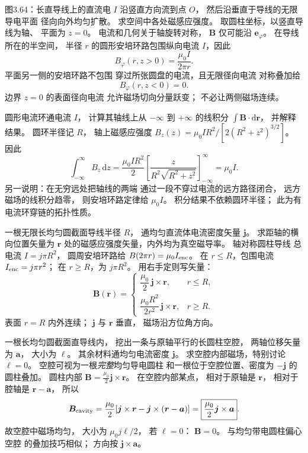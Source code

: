图3.64：长直导线上的直流电
$I$ 沿竖直方向流到点 $O$，
然后沿垂直于导线的无限导电平面
径向向外均匀扩散。
求空间中各处磁感应强度。
\exsolution
取圆柱坐标，以竖直导线为轴、
平面为 $z=0$。
电流和几何关于轴旋转对称，
$\bm B$ 仅可能沿 $\bm e_\varphi$。
在导线所在的半空间，
半径 $r$ 的圆形安培环路包围纵向电流
$I$，因此
\[
\boxed{B_\varphi(r,z>0)=
\frac{\mu_0I}{2\pi r}}.
\]
平面另一侧的安培环路不包围
穿过所张圆盘的电流，且无限径向电流
对称叠加给
\[
\boxed{B_\varphi(r,z<0)=0}.
\]
\excheck 边界 $z=0$ 的表面径向电流
允许磁场切向分量跃变；
不必让两侧磁场连续。

圆形电流环通电流 $I$，
计算其轴线上从 $-\infty$ 到
$+\infty$ 的线积分
$\int\bm B\cdot\mathrm d\bm r$，
并解释结果。
\exsolution
圆环半径记 $R$，
轴上磁感应强度
$B_z(z)=\mu_0IR^2/[2(R^2+z^2)^{3/2}]$。
因此
\[
\int_{-\infty}^{\infty}B_z\,\mathrm dz
=\frac{\mu_0IR^2}{2}
\left[\frac{z}{R^2\sqrt{R^2+z^2}}\right]_{-\infty}^{\infty}
=\boxed{\mu_0I}.
\]
另一说明：在无穷远处把轴线的两端
通过一段不穿过电流的远方路径闭合，
远方磁场的线积分趋零，
则安培环路定律给 $\mu_0I$。
\excheck 积分结果不依赖圆环半径；
此为有电流环穿链的拓扑性质。

一根无限长均匀圆截面导线半径 $R$，
通均匀直流体电流密度矢量 $\bm j$。
求距轴的横向位置矢量为 $\bm r$
处的磁感应强度矢量，内外均为真空磁导率。
\exsolution
轴对称圆柱导线
总电流 $I=j\pi R^2$，
圆周安培环路给
$B(2\pi r)=\mu_0I_{\rm enc}$。
在 $r\le R$，包围电流
$I_{\rm enc}=j\pi r^2$；
在 $r\ge R$，为
$j\pi R^2$。
用右手定则写矢量：
\[
\boxed{\bm B(\bm r)=
\begin{cases}
\dfrac{\mu_0}{2}\,\bm j\times\bm r,
&r\le R,\\[2mm]
\dfrac{\mu_0R^2}{2r^2}\,
\bm j\times\bm r,&r\ge R.
\end{cases}}
\]
\excheck 表面 $r=R$ 内外连续；
$\bm j$ 与 $\bm r$ 垂直，
磁场沿方位角方向。

一根长均匀圆截面直导线内，
挖出一条与原轴平行的长圆柱空腔，
两轴位移矢量为 $\bm a$，
大小为 $\ell$。
其余材料通均匀电流密度 $\bm j$。
求空腔内部磁场，特别讨论 $\ell=0$。
\exsolution
空腔可视为一根\emph{完整}均匀导电圆柱
和一根位于空腔位置、密度为 $-\bm j$
的圆柱叠加。
圆柱内部
$\bm B=\frac{\mu_0}{2}\bm j\times\bm r$。
在空腔内部某点，
相对于原轴是 $\bm r$，
相对于腔轴是 $\bm r-\bm a$，
所以
\[
\bm B_{\rm cavity}=
\frac{\mu_0}{2}
[\bm j\times\bm r-\bm j\times(\bm r-\bm a)]
=\boxed{\frac{\mu_0}{2}\bm j\times\bm a}.
\]
故空腔中磁场均匀，
大小为 $\mu_0j\ell/2$，
若 $\ell=0$：
$\boxed{\bm B=0}$。
\excheck 与均匀带电圆柱偏心空腔
的叠加技巧相似；
方向按 $\bm j\times\bm a$。

